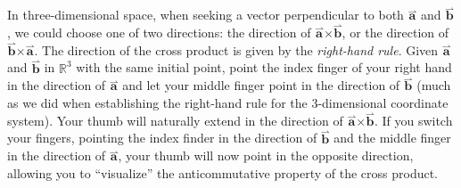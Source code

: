 \documentclass{ximera}
\begin{document}
In three-dimensional space, when seeking a vector perpendicular to both 
$\overset{\boldsymbol{\rightharpoonup}}{\mathbf{a}}$ and $\overset{\boldsymbol{\rightharpoonup}}{\mathbf{b}}$, we could choose one of two directions: the direction
of $\overset{\boldsymbol{\rightharpoonup}}{\mathbf{a}} \boldsymbol\times \overset{\boldsymbol{\rightharpoonup}}{\mathbf{b}}$, or the direction of
$\overset{\boldsymbol{\rightharpoonup}}{\mathbf{b}} \boldsymbol\times \overset{\boldsymbol{\rightharpoonup}}{\mathbf{a}}$.  The direction of the cross product is given
by the \textit{right-hand rule}.  Given $\overset{\boldsymbol{\rightharpoonup}}{\mathbf{a}}$ and $\overset{\boldsymbol{\rightharpoonup}}{\mathbf{b}}$ in
$\mathbb{R}^3$ with the same initial point, point the index finger of your
right hand in the direction of $\overset{\boldsymbol{\rightharpoonup}}{\mathbf{a}}$ and let your middle finger
point in the direction of $\overset{\boldsymbol{\rightharpoonup}}{\mathbf{b}}$ (much as we did when establishing
the right-hand rule for the 3-dimensional coordinate system). Your
thumb will naturally extend in the direction of
$\overset{\boldsymbol{\rightharpoonup}}{\mathbf{a}} \boldsymbol\times \overset{\boldsymbol{\rightharpoonup}}{\mathbf{b}}$.  If you switch your fingers, pointing the index finder in
the direction of $\overset{\boldsymbol{\rightharpoonup}}{\mathbf{b}}$ and the middle finger in the direction of
$\overset{\boldsymbol{\rightharpoonup}}{\mathbf{a}}$, your thumb will now point in the opposite direction,
allowing you to ``visualize'' the anticommutative property of the
cross product.
\end{document}
